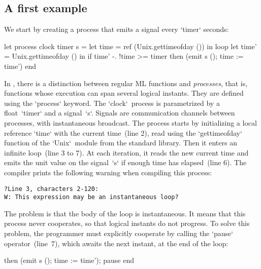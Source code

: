 \documentclass[9pt,preprint]{sigplanconf}
\begin{document}
\subsection{A first example}
\label{sec:first_example}

We start by creating a process that emits a signal every `timer` seconds:
%
\begin{rmlcl}
let process clock timer s =
  let time = ref (Unix.gettimeofday ()) in
  loop
    let time' = Unix.gettimeofday () in
    if time' -. !time >= timer
    then (emit s (); time := time')
  end
\end{rmlcl}
%
In \rml, there is a distinction between regular ML functions and \emph{processes}, that is, functions whose execution can span several logical instants.  They are defined using the `process` keyword. The `clock`~process is parametrized by a float~`timer` and a signal~`s`. Signals are communication channels between processes, with instantaneous broadcast. The process starts by initializing a local reference `time` with the current time~(line 2), read using the `gettimeofday` function of the `Unix`~module from the standard library. Then it enters an infinite loop~(line 3 to 7). At each iteration, it reads the new current time and emits the unit value on the signal~`s` if enough time has elapsed~(line 6). The compiler prints the following warning when compiling this process:
\begin{lstlisting}
?Line 3, characters 2-120:
W: This expression may be an instantaneous loop?
\end{lstlisting}
The problem is that the body of the loop is instantaneous. It means that this process never cooperates, so that logical instants do not progress. To solve this problem, the programmer must explicitly cooperate by calling the `pause` operator~(line~7), which awaits the next instant, at the end of the loop:
\begin{rmlcl}[5]
[...]
    then (emit s (); time := time');
    pause 
  end
\end{rmlcl}
\end{document}
